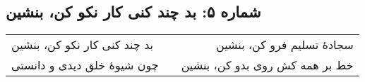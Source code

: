 \begin{center}
\section*{شماره ۵: بد چند کنی کار نکو کن، بنشین}
\label{sec:005}
\begin{longtable}{l p{0.5cm} r}
بد چند کنی کار نکو کن، بنشین
&&
سجادهٔ تسلیم فرو کن، بنشین
\\
چون شیوهٔ خلق دیدی و دانستی
&&
خط بر همه کش روی بدو کن، بنشین
\\
\end{longtable}
\end{center}
